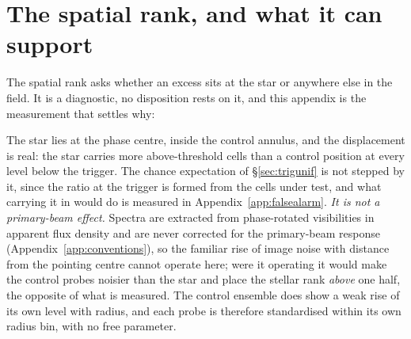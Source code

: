 \section{The spatial rank, and what it can support}
\label{app:radius}

The spatial rank asks whether an excess sits at the star or anywhere else in
the field. It is a diagnostic, no disposition rests on it, and this appendix
is the measurement that settles why: \rankstatus{}

The star lies at the phase centre, inside the control annulus, and the
displacement is real: the star carries more above-threshold cells than a
control position at every level below the trigger. The chance expectation of
\S\ref{sec:trigunif} is not stepped by it, since the ratio at the trigger is
formed from the cells under test, and what carrying it in would do is measured
in Appendix~\ref{app:falsealarm}. \emph{It is not a primary-beam effect.}
Spectra are extracted from phase-rotated visibilities in apparent flux density
and are never corrected for the primary-beam response
(Appendix~\ref{app:conventions}), so the familiar rise of image noise with
distance from the pointing centre cannot operate here; were it operating it
would make the control probes noisier than the star and place the stellar rank
\emph{above} one half, the opposite of what is measured. The control ensemble
does show a weak rise of its own level with radius, and each probe is
therefore standardised within its own radius bin, with no free parameter.

